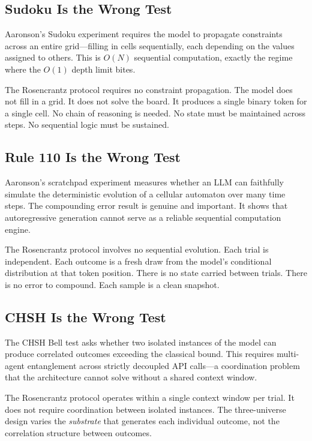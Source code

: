 \documentclass[12pt,a4paper]{article}
\begin{document}
\subsection{Sudoku Is the Wrong Test}

Aaronson's Sudoku experiment \citep{aaronson2026_classical} requires the model to propagate constraints across an entire grid---filling in cells sequentially, each depending on the values assigned to others. This is $O(N)$ sequential computation, exactly the regime where the $O(1)$ depth limit bites.

The Rosencrantz protocol requires no constraint propagation. The model does not fill in a grid. It does not solve the board. It produces a single binary token for a single cell. No chain of reasoning is needed. No state must be maintained across steps. No sequential logic must be sustained.

\subsection{Rule 110 Is the Wrong Test}

Aaronson's scratchpad experiment \citep{aaronson2026_scratchpad} measures whether an LLM can faithfully simulate the deterministic evolution of a cellular automaton over many time steps. The compounding error result is genuine and important. It shows that autoregressive generation cannot serve as a reliable sequential computation engine.

The Rosencrantz protocol involves no sequential evolution. Each trial is independent. Each outcome is a fresh draw from the model's conditional distribution at that token position. There is no state carried between trials. There is no error to compound. Each sample is a clean snapshot.

\subsection{CHSH Is the Wrong Test}

The CHSH Bell test \citep{aaronson2026_chsh} asks whether two isolated instances of the model can produce correlated outcomes exceeding the classical bound. This requires multi-agent entanglement across strictly decoupled API calls---a coordination problem that the architecture cannot solve without a shared context window.

The Rosencrantz protocol operates within a single context window per trial. It does not require coordination between isolated instances. The three-universe design varies the \emph{substrate} that generates each individual outcome, not the correlation structure between outcomes.
\end{document}
